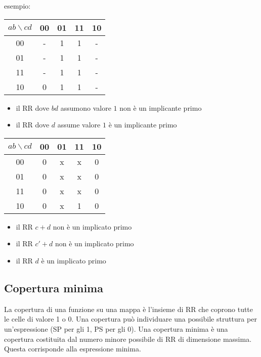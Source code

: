\documentclass{article}
\begin{document}
\noindent
esempio:

\begin{center}
\begin{tabular}{ |c|c|c|c|c| }
\hline
$ab \backslash cd$ & 00 & 01 & 11 & 10 \\
\hline
\hline
00 & - & 1 & 1 & - \\
01 & - & 1 & 1 & - \\
11 & - & 1 & 1 & - \\
10 & 0 & 1 & 1 & - \\
\hline
\end{tabular}
\end{center}

\begin{itemize}
    \item il RR dove $bd$ assumono valore $1$ non è un implicante primo
    \item il RR dove $d$ assume valore $1$ è un implicante primo
\end{itemize}

\begin{center}
\begin{tabular}{ |c|c|c|c|c| }
\hline
$ab \backslash cd$ & 00 & 01 & 11 & 10 \\
\hline
\hline
00 & 0 & x & x & 0 \\
01 & 0 & x & x & 0 \\
11 & 0 & x & x & 0 \\
10 & 0 & x & 1 & 0 \\
\hline
\end{tabular}
\end{center}

\begin{itemize}
    \item il RR $c+d$ non è un implicato primo
    \item il RR $c'+d$ non è un implicato primo
    \item il RR $d$ è un implicato primo
\end{itemize}

\subsection{Copertura minima}

La copertura di una funzione su una mappa è l'insieme di RR che coprono tutte le celle di valore 1 o 0.
Una copertura può individuare una possibile struttura per un'espressione (SP per gli 1, PS per gli 0).
Una copertura minima è una copertura costituita dal numero minore possibile di RR di dimensione massima.
Questa corrisponde alla espressione minima.\\
\end{document}
